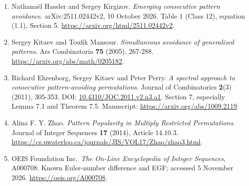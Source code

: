\documentclass[
  11pt,
]{article}
\begin{document}
\begin{enumerate}
\def\labelenumi{\arabic{enumi}.}
\item
  Nathanaël Hassler and Sergey Kirgizov. \emph{Emerging consecutive
  pattern avoidance}. arXiv:2511.02442v2, 10 October 2026. Table 1
  (Class 12), equation (1.1), Section 5.
  \url{https://arxiv.org/html/2511.02442v2}.
\item
  Sergey Kitaev and Toufik Mansour. \emph{Simultaneous avoidance of
  generalized patterns}. Ars Combinatoria \textbf{75} (2005), 267-288.
  \url{https://arxiv.org/abs/math/0205182}.
\item
  Richard Ehrenborg, Sergey Kitaev and Peter Perry. \emph{A spectral
  approach to consecutive pattern-avoiding permutations}. Journal of
  Combinatorics \textbf{2}(3) (2011), 305-353. DOI:
  \href{https://doi.org/10.4310/JOC.2011.v2.n3.a1}{10.4310/JOC.2011.v2.n3.a1}.
  Section 7, especially Lemma 7.1 and Theorem 7.5. Manuscript:
  \url{https://arxiv.org/abs/1009.2119}.
\item
  Alina F. Y. Zhao. \emph{Pattern Popularity in Multiply Restricted
  Permutations}. Journal of Integer Sequences \textbf{17} (2014),
  Article 14.10.3.
  \url{https://cs.uwaterloo.ca/journals/JIS/VOL17/Zhao/zhao3.html}.
\item
  OEIS Foundation Inc.~\emph{The On-Line Encyclopedia of Integer
  Sequences}, A000708. Known Euler-number difference and EGF; accessed 5
  November 2026. \url{https://oeis.org/A000708}.
\end{enumerate}
\end{document}
